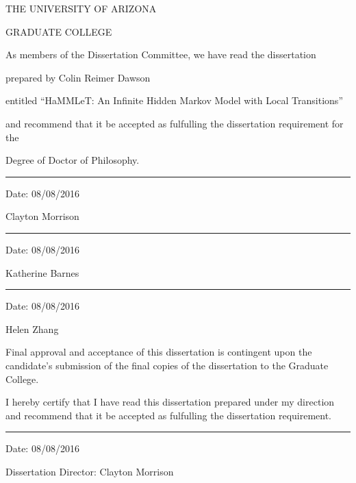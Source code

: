 \begin{center}
\MakeUppercase{The University of Arizona}

\MakeUppercase{Graduate College}

\end{center}

\begin{flushleft}
\begin{singlespace}
As members of the Dissertation Committee, we have read the dissertation

\vspace{0.25in}

prepared by Colin Reimer Dawson

\vspace{0.25in}

entitled ``HaMMLeT: An Infinite Hidden Markov Model with Local Transitions''

\vspace{0.25in}

and recommend that it be accepted as fulfulling the dissertation requirement for the

\vspace{0.25in}

Degree of Doctor of Philosophy.

\vspace{0.25in}

\rule{4in}{1pt} Date: 08/08/2016

Clayton Morrison




\vspace{0.25in}

\rule{4in}{1pt} Date: 08/08/2016

Katherine Barnes

\vspace{0.25in}

\rule{4in}{1pt} Date: 08/08/2016

Helen Zhang

\vspace{0.25in}

Final approval and acceptance of this dissertation is contingent upon the candidate's submission of the final copies of the dissertation to the Graduate College.

\vspace{0.25in}

I hereby certify that I have read this dissertation prepared under my direction and recommend that it be accepted as fulfulling the dissertation requirement.

\vspace{0.25in}

\rule{4in}{1pt} Date: 08/08/2016

Dissertation Director: Clayton Morrison




\vspace{0.25in}

\end{singlespace}
\end{flushleft}



